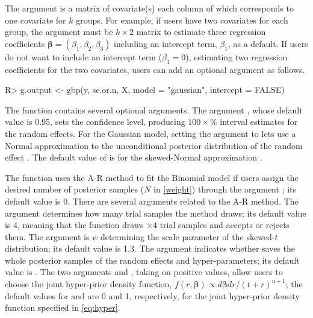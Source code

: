 \documentclass[article]{jss}
\begin{document}
The argument  is a matrix of covariate(s) each column of which corresponds to one covariate for $k$ groups. For example, if users have two covariates for each group, the argument  must be $k\times2$ matrix to estimate three regression coefficients $\boldsymbol{\beta}=(\beta_1, \beta_2, \beta_3)$ including an intercept term, $\beta_1$, as a default. If users do not want to include an intercept term ($\beta_1=0$), estimating two regression coefficients for the two covariates, users can add an optional argument  as follows.
\begin{CodeChunk}
\begin{CodeInput}
R> g.output <- gbp(y, se.or.n, X, model = "gaussian", intercept = FALSE)
\end{CodeInput}
\end{CodeChunk}

The function  contains several optional arguments. The argument , whose default value is 0.95, sets the confidence level, producing $100\times$\% interval estimates for the random effects. For the Gaussian model, setting the argument  to  lets   use a Normal approximation to the unconditional posterior distribution of the random effect \citep{tang2011}. The default value of  is  for the skewed-Normal approximation \citep{kelly2014advances}. 

The function  uses the A-R method to fit the Binomial model if users assign the desired number of posterior samples ($N$ in  \eqref{weight}) through the argument ; its default value is 0. There are several arguments related to the A-R method. The argument  determines how many trial samples the method draws; its default value is 4, meaning that the function  draws  $\times4$ trial samples and accepts or rejects them. The argument  is $\psi$ determining the scale parameter of the skewed-$t$ distribution; its default value is 1.3. The argument  indicates whether  saves the whole posterior samples of the random effects and hyper-parameters; its default value is . The two arguments  and , taking on positive values, allow users to choose the joint hyper-prior density function, $f(r, \boldsymbol{\beta})\propto d\boldsymbol{\beta}dr/(t+r)^{u+1}$; the default values for  and  are 0 and 1, respectively, for the joint hyper-prior density function specified in  \eqref{eq:hyper}. 
\end{document}
